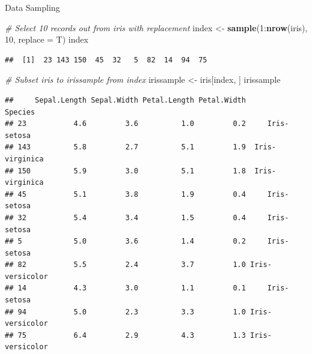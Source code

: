 \documentclass[ignorenonframetext,]{beamer}
\newenvironment{Shaded}{\begin{snugshade}}{\end{snugshade}}
\newcommand{\KeywordTok}[1]{\textcolor[rgb]{0.13,0.29,0.53}{\textbf{{#1}}}}
\newcommand{\DataTypeTok}[1]{\textcolor[rgb]{0.13,0.29,0.53}{{#1}}}
\newcommand{\DecValTok}[1]{\textcolor[rgb]{0.00,0.00,0.81}{{#1}}}
\newcommand{\StringTok}[1]{\textcolor[rgb]{0.31,0.60,0.02}{{#1}}}
\newcommand{\CommentTok}[1]{\textcolor[rgb]{0.56,0.35,0.01}{\textit{{#1}}}}
\newcommand{\NormalTok}[1]{{#1}}
\begin{document}
\begin{frame}[fragile]{Data Sampling}

\begin{Shaded}
\begin{Highlighting}[]
\CommentTok{# Select 10 records out from iris with replacement}
\NormalTok{index <-}\StringTok{ }\KeywordTok{sample}\NormalTok{(}\DecValTok{1}\NormalTok{:}\KeywordTok{nrow}\NormalTok{(iris), }\DecValTok{10}\NormalTok{, }\DataTypeTok{replace =} \NormalTok{T)}
\NormalTok{index}
\end{Highlighting}
\end{Shaded}

\begin{verbatim}
##  [1]  23 143 150  45  32   5  82  14  94  75
\end{verbatim}

\end{frame}

\begin{frame}[fragile]{}

\begin{Shaded}
\begin{Highlighting}[]
\CommentTok{# Subset iris to irissample from index}
\NormalTok{irissample <-}\StringTok{ }\NormalTok{iris[index, ]}
\NormalTok{irissample}
\end{Highlighting}
\end{Shaded}

\begin{verbatim}
##     Sepal.Length Sepal.Width Petal.Length Petal.Width         Species
## 23           4.6         3.6          1.0         0.2     Iris-setosa
## 143          5.8         2.7          5.1         1.9  Iris-virginica
## 150          5.9         3.0          5.1         1.8  Iris-virginica
## 45           5.1         3.8          1.9         0.4     Iris-setosa
## 32           5.4         3.4          1.5         0.4     Iris-setosa
## 5            5.0         3.6          1.4         0.2     Iris-setosa
## 82           5.5         2.4          3.7         1.0 Iris-versicolor
## 14           4.3         3.0          1.1         0.1     Iris-setosa
## 94           5.0         2.3          3.3         1.0 Iris-versicolor
## 75           6.4         2.9          4.3         1.3 Iris-versicolor
\end{verbatim}

\end{frame}
\end{document}
